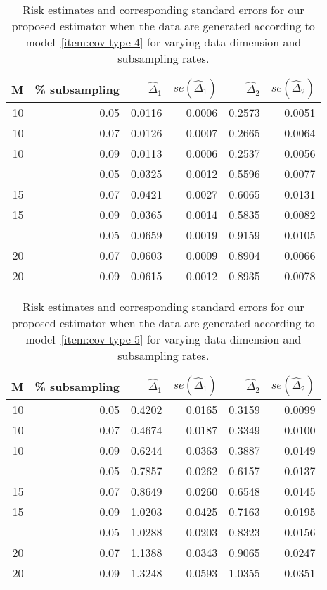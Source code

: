 \documentclass[12pt]{article}
\theoremstyle{definition}
\begin{document}
\begin{table}[H]
\centering
\begin{tabular}{rrrrrr}
  \hline
M & \% subsampling & $\hat{\Delta}_1$ & $se\left( \hat{\Delta}_1\right)$& $\hat{\Delta}_2$ & $se\left( \hat{\Delta}_2\right)$ \\ 
  \hline
10 & 0.05 & 0.0116 & 0.0006 & 0.2573 & 0.0051 \\ 
  10 & 0.07 & 0.0126 & 0.0007 & 0.2665 & 0.0064 \\ 
  10 & 0.09 & 0.0113 & 0.0006 & 0.2537 & 0.0056 \\ 
    \hdashline
  15 & 0.05 & 0.0325 & 0.0012 & 0.5596 & 0.0077 \\ 
  15 & 0.07 & 0.0421 & 0.0027 & 0.6065 & 0.0131 \\ 
  15 & 0.09 & 0.0365 & 0.0014 & 0.5835 & 0.0082 \\ 
    \hdashline
  20 & 0.05 & 0.0659 & 0.0019 & 0.9159 & 0.0105 \\ 
  20 & 0.07 & 0.0603 & 0.0009 & 0.8904 & 0.0066 \\ 
  20 & 0.09 & 0.0615 & 0.0012 & 0.8935 & 0.0078 \\ 
   \hline
\end{tabular}
\caption{Risk estimates and corresponding standard errors for our proposed estimator when the data are generated according to model~\ref{item:cov-type-4} for varying data dimension and subsampling rates.} 
\end{table}
\begin{table}[H]
\centering
\begin{tabular}{rrrrrr}
  \hline
M & \% subsampling & $\hat{\Delta}_1$ & $se\left( \hat{\Delta}_1\right)$& $\hat{\Delta}_2$ & $se\left( \hat{\Delta}_2\right)$ \\ 
  \hline
10 & 0.05 & 0.4202 & 0.0165 & 0.3159 & 0.0099 \\ 
  10 & 0.07 & 0.4674 & 0.0187 & 0.3349 & 0.0100 \\ 
  10 & 0.09 & 0.6244 & 0.0363 & 0.3887 & 0.0149 \\ 
  \hdashline
  15 & 0.05 & 0.7857 & 0.0262 & 0.6157 & 0.0137 \\ 
  15 & 0.07 & 0.8649 & 0.0260 & 0.6548 & 0.0145 \\ 
  15 & 0.09 & 1.0203 & 0.0425 & 0.7163 & 0.0195 \\ 
    \hdashline
  20 & 0.05 & 1.0288 & 0.0203 & 0.8323 & 0.0156 \\ 
  20 & 0.07 & 1.1388 & 0.0343 & 0.9065 & 0.0247 \\ 
  20 & 0.09 & 1.3248 & 0.0593 & 1.0355 & 0.0351 \\ 
   \hline
\end{tabular}
\caption{Risk estimates and corresponding standard errors for our proposed estimator when the data are generated according to model~\ref{item:cov-type-5} for varying data dimension and subsampling rates.} 
\end{table}
\end{document}
